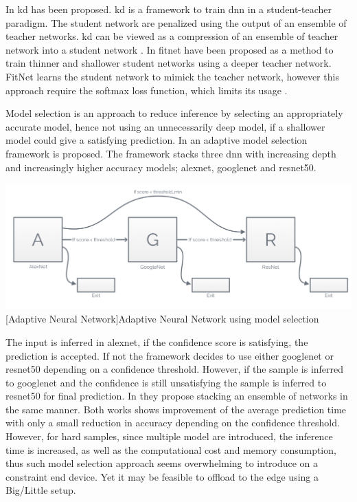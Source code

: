 \begin{enumdescript}
	In \cite{hinton_distilling_2015} \gls{kd} has been proposed. \gls{kd} is a framework to train \gls{dnn} in a student-teacher paradigm. The student network are penalized using the output of an ensemble of teacher networks. \gls{kd} can be viewed as a compression of an ensemble of teacher network into a student network \cite{cheng_survey_2017}. 
	In \cite{romero_fitnets:_2014} \gls{fitnet} have been proposed as a method to train thinner and shallower student networks using a deeper teacher network. FitNet learns the student network to mimick the teacher network, however this approach require the softmax loss function, which limits its usage \cite{cheng_survey_2017}.  
	
	\item[Model Selection] Model selection is an approach to reduce inference by selecting an appropriately accurate model, hence not using an unnecessarily deep model, if a shallower model could give a satisfying prediction. In \cite{bolukbasi_adaptive_2017} an adaptive model selection framework is proposed. The framework stacks three \gls{dnn} with increasing depth and increasingly higher accuracy models; \gls{alexnet}, \gls{googlenet} and \gls{resnet}50. 

	\begin{minipage}[t]{\linewidth}
		\centering                           
		\includegraphics[width=.8\linewidth]{figures/models/adaptive}
		[Adaptive Neural Network]{Adaptive Neural Network using model selection}
	\end{minipage}
	
	The input is inferred in \gls{alexnet}, if the confidence score is satisfying, the prediction is accepted. If not the framework decides to use either \gls{googlenet} or \gls{resnet}50 depending on a confidence threshold. However, if the sample is inferred to \gls{googlenet} and the confidence is still unsatisfying the sample is inferred to \gls{resnet}50 for final prediction. In \cite{tann_flexible_2018} they propose stacking an ensemble of networks in the same manner. Both works shows improvement of the average prediction time with only a small reduction in accuracy depending on the confidence threshold. However, for hard samples, since multiple model are introduced, the inference time is increased, as well as the computational cost and memory consumption, thus such model selection approach seems overwhelming to introduce on a constraint end device. Yet it may be feasible to offload to the edge using a Big/Little setup.
	

\end{enumdescript}
